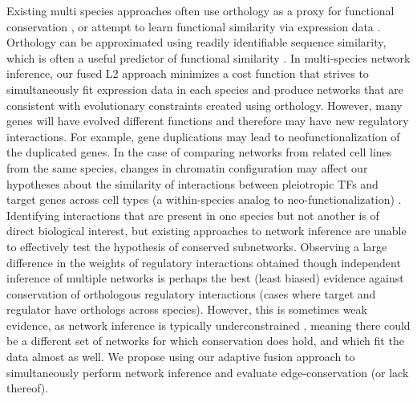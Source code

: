 \documentclass[11pt]{article}
\begin{document}
Existing multi species approaches often use orthology as a proxy for functional conservation \cite{roy_arboretum:_2013, penfold_inferring_2015, joshi_multi-species_2015, kashima_simultaneous_2009, zhang2010nearly}, or attempt to learn functional similarity via expression data \cite{gholami_cross-species_2010}. 
Orthology can be approximated using readily identifiable sequence similarity, which is often a useful predictor of functional similarity \cite{wilson_assessing_2000, jensen_eggnog:_2008}. 
In multi-species network inference, our fused L2 approach minimizes a cost function that strives to simultaneously fit expression data in each species and produce networks that are consistent with evolutionary constraints created using orthology. 
However, many genes will have evolved different functions and therefore may have new regulatory interactions. 
For example, gene duplications may lead to neofunctionalization \cite{eisen_phylogenomics:_1998} of the duplicated genes. 
In the case of comparing networks from related cell lines from the same species, changes in chromatin configuration may affect our hypotheses about the similarity of interactions between pleiotropic TFs and target genes across cell types (a within-species analog to neo-functionalization) \cite{li_role_2007}.
Identifying interactions that are present in one species but not another is of direct biological interest, but existing approaches to network inference are unable to effectively test the hypothesis of conserved subnetworks. 
Observing a large difference in the weights of regulatory interactions obtained though independent inference of multiple networks is perhaps the best (least biased) evidence against conservation of orthologous regulatory interactions (cases where target and regulator have orthologs across species). 
However, this is sometimes weak evidence, as network inference is typically underconstrained \cite{marbach_revealing_2010-1}, meaning there could be a different set of networks for which conservation does hold, and which fit the data almost as well. 
We propose using our adaptive fusion approach to simultaneously perform network inference and evaluate edge-conservation (or lack thereof). 
\end{document}

